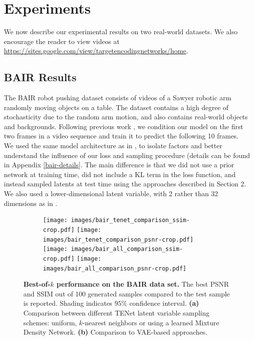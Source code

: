 \documentclass{article}
\newcommand{\modelname}{TENet }
\begin{document}
\section{Experiments}

We now describe our experimental results on two real-world datasets.
We also encourage the reader to view videos at \url{https://sites.google.com/view/targetencodingnetworks/home}.


\subsection{BAIR Results}

The BAIR robot pushing dataset \citep{Ebert17} consists of videos of a Sawyer robotic arm randomly moving objects on a table.
The dataset contains a high degree of stochasticity due to the random arm motion, and also contains real-world objects and backgrounds.
Following previous work \citep{Babaeizadeh2018, Denton2018}, we condition our model on the first two frames in a video sequence and train it to predict the following 10 frames.
We used the same model architecture as in \citep{Denton2018}, to isolate factors and better understand the influence of our loss and sampling procedure (details can be found in Appendix \ref{bair-details}.
The main difference is that we did not use a prior network at training time, did not include a KL term in the loss function, and instead sampled latents at test time using the approaches described in Section 2. We also used a lower-dimensional latent variable, with 2 rather than 32 dimensions as in \citep{Denton2018}.

\begin{figure}
  \centering
  \begin{subfigure}[b]{\textwidth}
    \centering
  \texttt{[image: images/bair\_tenet\_comparison\_ssim-crop.pdf]}
  \texttt{[image: images/bair\_tenet\_comparison\_psnr-crop.pdf]}
  \texttt{[image: images/bair\_all\_comparison\_ssim-crop.pdf]}
  \texttt{[image: images/bair\_all\_comparison\_psnr-crop.pdf]}
  \caption{}
  \end{subfigure}
  \caption{
    \textbf{Best-of-$k$ performance on the BAIR data set.}
    The best PSNR and SSIM out of 100 generated samples compared to the test sample is reported.
    Shading indicates $95\%$ confidence interval.
    \textbf{(a)} Comparison between different \modelname latent variable sampling schemes: uniform, $k$-nearest neighbors or using a learned Mixture Density Network.
    \textbf{(b)} Comparison to VAE-based approaches.
  }
  \label{bair}
\end{figure}
\end{document}
